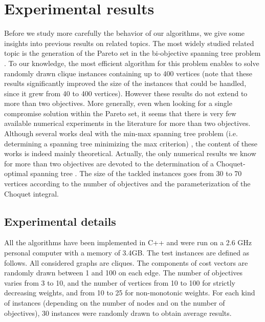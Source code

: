 \documentclass[final,3p,times]{elsarticle}
\begin{document}
\section{Experimental results} \label{STests}

Before we study more carefully the behavior of our algorithms, we give some insights into previous results on related topics. The most widely studied related topic is the generation of the Pareto set in the bi-objective spanning tree problem \cite{AndJL96,HamaR94,RaASG98,SourS08,SteiR08}. To our knowledge, the most efficient algorithm for this problem enables to solve randomly drawn clique instances containing up to 400 vertices \cite{SourS08} (note that these results significantly improved the size of the instances that could be handled, since it grew from 40 to 400 vertices). However these results do not extend to more than two objectives. More generally, even when looking for a single compromise solution within the Pareto set, it seems that there is very few available numerical experiments in the literature for more than two objectives. Although several works deal with the min-max spanning tree problem (i.e. determining a spanning tree minimizing the max criterion) \cite{AisBV07,AisBV09,HamaR94,Warbu85,Yu98}, the content of these works is indeed mainly theoretical. Actually, the only numerical results we know for more than two objectives are devoted to the determination of a Choquet-optimal spanning tree \cite{GalPS09}. The size of the tackled instances goes from 30 to 70 vertices according to the number of objectives and the parameterization of the Choquet integral.



\subsection{Experimental details} \label{SSImpl}

All the algorithms have been implemented in C++ and were run on a 2.6
GHz personal computer with a memory of 3.4GB. The test instances are defined as follows. All considered graphs are cliques. The components of cost vectors are randomly drawn between 1 and 100 on each edge. The number of objectives varies from 3
to 10, and the number of vertices from 10 to 100 for strictly decreasing weights, and from 10 to 25 for non-monotonic weights. For each kind of
instances (depending on the number of nodes and on the number of
objectives), 30 instances were randomly drawn to obtain average results. 
\end{document}

